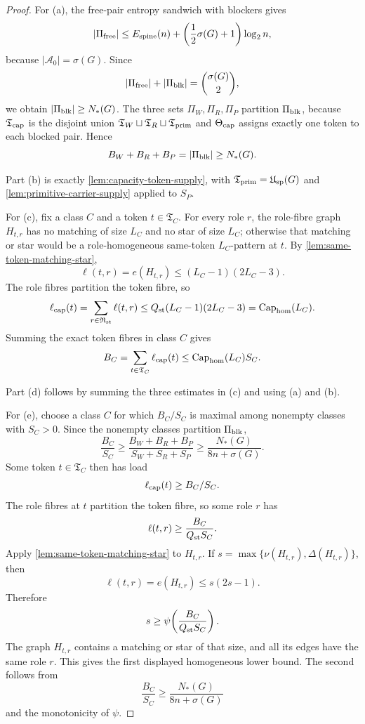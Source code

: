 \documentclass[11pt]{article}
\begin{document}
\begin{proof}
For (a), the free-pair entropy sandwich with blockers gives
\[
|\Pi_{\rm free}|
\le
E_{\rm spine}(n)+\left(\frac12\sigma(G)+1\right)\log_2 n,
\]
because \(|\mathcal A_0|=\sigma(G)\).  Since
\[
|\Pi_{\rm free}|+|\Pi_{\rm blk}|=\binom{\sigma(G)}2,
\]
we obtain \(|\Pi_{\rm blk}|\ge N_*(G)\).  The three sets
\(\Pi_W,\Pi_R,\Pi_P\) partition \(\Pi_{\rm blk}\), because
\(\mathfrak T_{\rm cap}\) is the disjoint union
\(\mathfrak T_W\sqcup\mathfrak T_R\sqcup\mathfrak T_{\rm prim}\) and
\(\Theta_{\rm cap}\) assigns exactly one token to each blocked pair.  Hence
\[
B_W+B_R+B_P=|\Pi_{\rm blk}|\ge N_*(G).
\]

Part (b) is exactly \cref{lem:capacity-token-supply}, with
\(\mathfrak T_{\rm prim}=\mathfrak U_{\rm sp}(G)\) and
\cref{lem:primitive-carrier-supply} applied to \(S_P\).

For (c), fix a class \(C\) and a token \(t\in\mathfrak T_C\).  For every role
\(r\), the role-fibre graph \(H_{t,r}\) has no matching of size \(L_C\) and no
star of size \(L_C\); otherwise that matching or star would be a
role-homogeneous same-token \(L_C\)-pattern at \(t\).  By
\cref{lem:same-token-matching-star},
\[
\ell(t,r)=e(H_{t,r})\le (L_C-1)(2L_C-3).
\]
The role fibres partition the token fibre, so
\[
\ell_{\rm cap}(t)
=\sum_{r\in\mathfrak R_{\rm st}}\ell(t,r)
\le
Q_{\rm st}(L_C-1)(2L_C-3)
=\operatorname{Cap}_{\rm hom}(L_C).
\]
Summing the exact token fibres in class \(C\) gives
\[
B_C
=\sum_{t\in\mathfrak T_C}\ell_{\rm cap}(t)
\le
\operatorname{Cap}_{\rm hom}(L_C)S_C .
\]

Part (d) follows by summing the three estimates in (c) and using (a) and (b).

For (e), choose a class \(C\) for which \(B_C/S_C\) is maximal among nonempty
classes with \(S_C>0\).  Since the nonempty classes partition
\(\Pi_{\rm blk}\),
\[
\frac{B_C}{S_C}\ge
\frac{B_W+B_R+B_P}{S_W+S_R+S_P}
\ge
\frac{N_*(G)}{8n+\sigma(G)} .
\]
Some token \(t\in\mathfrak T_C\) then has load
\[
\ell_{\rm cap}(t)\ge B_C/S_C.
\]
The role fibres at \(t\) partition the token fibre, so some role \(r\) has
\[
\ell(t,r)\ge\frac{B_C}{Q_{\rm st}S_C}.
\]
Apply \cref{lem:same-token-matching-star} to \(H_{t,r}\).  If
\(s=\max\{\nu(H_{t,r}),\Delta(H_{t,r})\}\), then
\[
\ell(t,r)=e(H_{t,r})\le s(2s-1).
\]
Therefore
\[
s\ge\psi\!\left(\frac{B_C}{Q_{\rm st}S_C}\right).
\]
The graph \(H_{t,r}\) contains a matching or star of that size, and all its
edges have the same role \(r\).  This gives the first displayed homogeneous
lower bound.  The second follows from
\[
\frac{B_C}{S_C}\ge \frac{N_*(G)}{8n+\sigma(G)}
\]
and the monotonicity of \(\psi\).
\end{proof}
\end{document}

